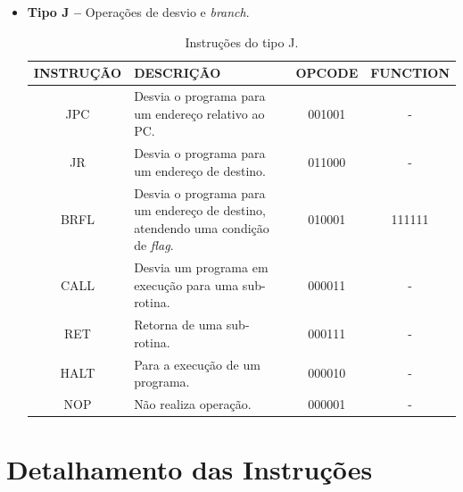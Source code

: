 \documentclass{report}
\begin{document}
\begin{itemize}
    \item \textbf{Tipo J --} Operações de desvio e \textit{branch}.
    
	\begin{table}[H]
	\centering
	\begin{tabular}{|c|m{6cm}|c|c|}
  	\hline 
  	\textbf{INSTRUÇÃO} & \textbf{DESCRIÇÃO} & \textbf{OPCODE} & \textbf{FUNCTION} \\ 
  	\hline 
  	JPC  & Desvia o programa para um endereço relativo ao PC. & 001001 & - \\ \hline
    JR   & Desvia o programa para um endereço de destino. & 011000 & - \\ \hline
  	BRFL & Desvia o programa para um endereço de destino, atendendo uma condição de \textit{flag}. & 010001 & 111111 \\ \hline
  	CALL & Desvia um programa em execução para uma sub-rotina. & 000011 & - \\ \hline
  	RET  & Retorna de uma sub-rotina. & 000111 & - \\ \hline
  	HALT & Para a execução de um programa. & 000010 & - \\ \hline
  	NOP  & Não realiza operação. & 000001 & - \\ \hline
  	\end{tabular} 
  	\caption{Instruções do tipo J.}
  \end{table}
    
    \end{itemize}

  \section{Detalhamento das Instruções}
  
\end{document}
